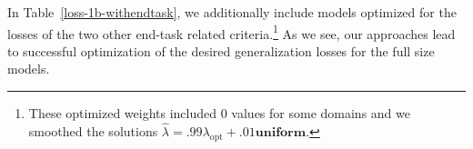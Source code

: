 In Table~\ref{loss-1b-withendtask}, we additionally include models optimized for the losses of the two other end-task related criteria.\footnote{These optimized weights included 0 values for some domains and we smoothed the solutions $\hat{\lambda} = .99 \lambda_{\mbox{opt}} + .01 \mathbf{uniform}$.} As we see, our approaches lead to successful optimization of the desired generalization losses for the full size models.






\begin{table}[t]
\begin{center}
\begin{small}
\begin{sc}
\end{sc}
\end{small}
\caption{Generalization on validation \textsc{sp} domains for 1B parameter models trained for 100B tokens with mixtures optimized according to different methods  over the \textsc{sp} domains. We compare Baselines (uniform and proportional to size), DoGE(124M), DoReMI (124M), to the mixture derived by \textsc{MTGP-mde-sp}. Per-domain and average (exponentiatated average loss) perplexity.} %
\label{loss-1b-training}

\end{center}
\end{table}





